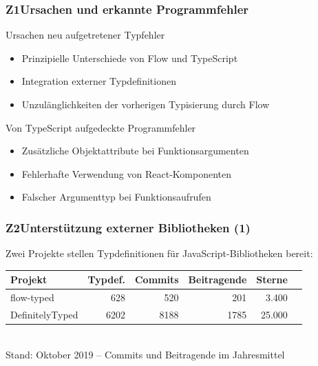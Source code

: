       \begin{frame}
        \frametitle{Z1\hspace{0.75em}Ursachen und erkannte Programmfehler}
        \begin{block}{Ursachen neu aufgetretener Typfehler}
          \begin{itemize}
            \item Prinzipielle Unterschiede von Flow und TypeScript
            \item Integration externer Typdefinitionen
            \item Unzulänglichkeiten der vorherigen Typisierung durch Flow
          \end{itemize}
        \end{block}
        \smallskip
        \begin{block}{Von TypeScript aufgedeckte Programmfehler}
          \begin{itemize}
            \item Zusätzliche Objektattribute bei Funktionsargumenten
            \item Fehlerhafte Verwendung von React-Komponenten
            \item Falscher Argumenttyp bei Funktionsaufrufen
          \end{itemize}
        \end{block}
      \end{frame}

      \begin{frame}
        \frametitle{Z2\hspace{0.75em}Unterstützung externer Bibliotheken (1)}
        Zwei Projekte stellen Typdefinitionen für JavaScript-Bibliotheken bereit:\\[1.5em]
        {
          \footnotesize
          \begin{tabu} to 
            \midrule
            \rowfont{\bfseries} Projekt & Typdef. & Commits & Beitragende & Sterne & {} \\
            \midrule
            flow-typed      &  628 &  520 &  201 &  3.400 & \autocite{FLOW_TYPED} \\
            DefinitelyTyped & 6202 & 8188 & 1785 & 25.000 & \autocite{DEFINITELY_TYPED} \\
            \midrule
          \end{tabu}
          \\[.75em]
          Stand: Oktober 2019 -- Commits und Beitragende im Jahresmittel
        }
      \end{frame}

